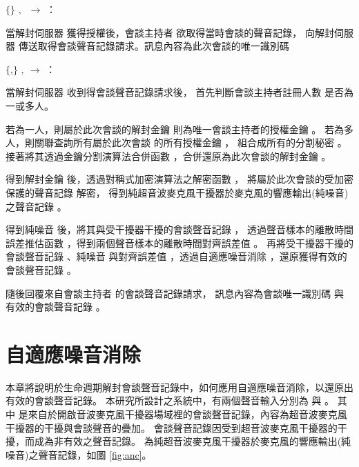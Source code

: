 \begin{pmsgs}
    \item $\{$\DEFsessionID$\}$ $,~$ \DEFowner $\rightarrow$ \DEFserver：

        當解封伺服器 \DEFserver 獲得授權後，會談主持者 \DEFowner 欲取得當時會談的聲音記錄，
    向解封伺服器 \DEFserver 傳送取得會談聲音記錄請求。訊息內容為此次會談的唯一識別碼 \DEFsessionID

    \item $\{$\DEFsessionID,\DEFrecREV$\}$ $,~$\DEFserver $\rightarrow$ \DEFowner：

        當解封伺服器 \DEFserver 收到得會談聲音記錄請求後，
    首先判斷會談主持者註冊人數 \DEFowreg 是否為一或多人。

        若為一人，則屬於此次會談的解封金鑰 \DEFunsealKey 則為唯一會談主持者的授權金鑰 \DEFagentKey。
    若為多人，則關聯查詢所有屬於此次會談 \DEFownerAll 的所有授權金鑰 \DEFagentKey，
    組合成所有的分割秘密 \DEFsharesAll。
    接著將其透過金鑰分割演算法合併函數 \DEFfuncSSC{}，合併還原為此次會談的解封金鑰 \DEFunsealKey。

        得到解封金鑰 \DEFunsealKey 後，透過對稱式加密演算法之解密函數 \DEFfuncDecEK{}，
    將屬於此次會談的受加密保護的聲音記錄 \DEFrecP 解密，
    得到純超音波麥克風干擾器於麥克風的響應輸出(純噪音)之聲音記錄 \DEFrecN。

        得到純噪音 \DEFrecN 後，將其與受干擾器干擾的會談聲音記錄 \DEFrecJ，
    透過聲音樣本的離散時間誤差推估函數 \DEFfuncEstm{}，得到兩個聲音樣本的離散時間對齊誤差值 \DEFshift。
    再將受干擾器干擾的會談聲音記錄 \DEFrecJ、純噪音 \DEFrecN
    與對齊誤差值 \DEFshift，透過自適應噪音消除 \DEFfuncAnc{}，還原獲得有效的會談聲音記錄 \DEFrecREV。

        隨後回覆來自會談主持者 \DEFowner 的會談聲音記錄請求，
    訊息內容為會談唯一識別碼 \DEFsessionID 與 有效的會談聲音記錄 \DEFrecREV。
\end{pmsgs}


\section{自適應噪音消除}\label{sec:anc}

    本章將說明於生命週期解封會談聲音記錄中，如何應用自適應噪音消除，以還原出有效的會談聲音記錄。
本研究所設計之系統中，有兩個聲音輸入分別為 \DEFrecJ 與 \DEFrecN。
其中 \DEFrecJ 是來自於開啟音波麥克風干擾器場域裡的會談聲音記錄，內容為超音波麥克風干擾器的干擾與會談聲音的疊加。
會談聲音記錄因受到超音波麥克風干擾器的干擾，而成為非有效之聲音記錄。
\DEFrecN 為純超音波麥克風干擾器於麥克風的響應輸出(純噪音)之聲音記錄，如圖 \ref{fig:anc}。

